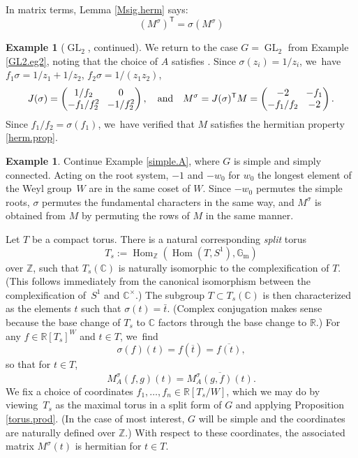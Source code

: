 \documentclass[JEP,XML,SOM,Unicode,NoFloatCountersInSection,published]{cedram}
\theoremstyle{definition}
\newtheorem{example}[equation]{Example}
\newcommand{\trans}{\mathsf{T}}
\newcommand{\R}{\mathbb{R}}
\newcommand{\C}{\mathbb{C}}
\newcommand{\Z}{\mathbb{Z}}
\newcommand{\Gm}{\mathbb{G}_{\mathrm{m}}}
\newcommand{\eand}{\quad\text{and}\quad}
\DeclareMathOperator{\GL}{GL}
\DeclareMathOperator{\Hom}{Hom}
\begin{document}
In matrix terms, Lemma \ref{Msig.herm} says:
\begin{equation}\label{herm.prop}
(M^\sigma)^\trans = \sigma(M^\sigma)
\end{equation}

\begin{example}[$\GL_2$, continued] \label{GL2.eg3}
We return to the case $G = \GL_2$ from Example \ref{GL2.eg2}, noting that the choice of $A$ satisfies . Since $\sigma(z_i) = 1/z_i$, we~have $f_1 \sigma = 1/z_1 + 1/z_2$, $f_2 \sigma = 1/(z_1 z_2)$,
\[\arraycolsep4pt
J(\sigma) =
\begin{pmatrix}
1/f_2 & 0 \\
-f_1/f_2^2 & -1/f_2^2
\end{pmatrix}, \eand
M^\sigma = J(\sigma)^\trans M =
\begin{pmatrix}
-2 & -f_1 \\
-f_1/f_2 & -2
\end{pmatrix}.
\]
Since $f_1/f_2 = \sigma(f_1)$, we~have verified that $M$ satisfies the hermitian property \eqref{herm.prop}.
\end{example}

\begin{example} \label{Msig.M}
Continue Example \ref{simple.A}, where $G$ is simple and simply connected. Acting on the root system, $-1$ and $-w_0$ for $w_0$ the longest element of the Weyl group~$W$ are in the same coset of $W$. Since $-w_0$ permutes the simple roots, $\sigma$ permutes the fundamental characters in the same way, and $M^\sigma$ is obtained from $M$ by permuting the rows of $M$ in the same manner.
\end{example}

Let $T$ be a compact torus. There is a natural corresponding \emph{split}
torus
\[
T_s:=\Hom_\Z(\Hom(T,S^1),\Gm)
\]
over $\Z$, such that $T_s(\C)$ is naturally isomorphic to the
complexification of $T$. (This follows immediately from the canonical
isomorphism between the complexification of~$S^1$ and $\C^\times$.) The
subgroup $T\subset T_s(\C)$ is then characterized as the elements $t$ such
that $\sigma(t)=\bar{t}$. (Complex conjugation makes sense because the
base change of $T_s$ to $\C$ factors through the base change to $\R$.) For any
$f\in \R[T_s]^W$ and $t\in T$, we~find
\[
\sigma(f)(t) = f(\overline{t}) = \overline{f(t)},
\]
so that for $t\in T$,
\[
M^\sigma_A(f,g)(t)
=
\overline{M^\sigma_A(g,f)(t)}.
\]
We fix a choice of coordinates $f_1,\dots,f_n\in \R[T_s/W]$, which we may do by viewing~$T_s$ as the maximal torus in a split form of $G$ and applying Proposition \ref{torus.prod}. (In the case of most interest, $G$ will be simple and the coordinates are naturally defined over $\Z$.) With respect to these coordinates,
the associated matrix $M^\sigma(t)$ is
hermitian for $t\in T$.
\end{document}
